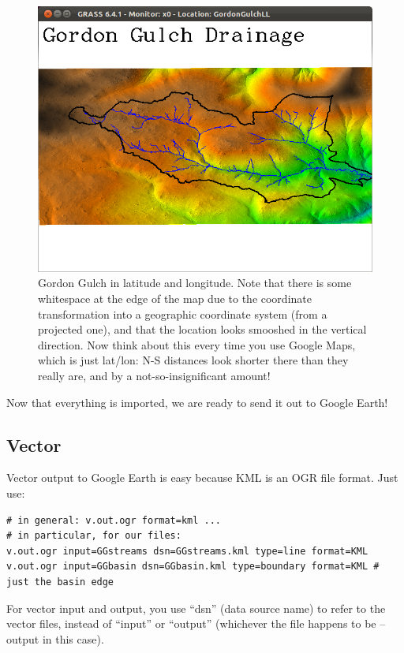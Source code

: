 \documentclass{book}
\begin{document}
\begin{figure}[h]
 \begin{center}
 \includegraphics[width=.9\linewidth]{figures/ubuntu/GGdrain_latlon.png}
 \caption{Gordon Gulch in latitude and longitude. Note that there is some whitespace at the edge of the map due to the coordinate transformation into a geographic coordinate system (from a projected one), and that the location looks smooshed in the vertical direction. Now think about this every time you use Google Maps, which is just lat/lon: N-S distances look shorter there than they really are, and by a not-so-insignificant amount!}
 \label{fig:GGdrain_latlon}
 \end{center}
\end{figure}

Now that everything is imported, we are ready to send it out to Google Earth!

\subsection{Vector}

Vector output to Google Earth is easy because KML is an OGR file format. Just use:
\begin{lstlisting}
# in general: v.out.ogr format=kml ...
# in particular, for our files:
v.out.ogr input=GGstreams dsn=GGstreams.kml type=line format=KML 
v.out.ogr input=GGbasin dsn=GGbasin.kml type=boundary format=KML # just the basin edge
\end{lstlisting}
For vector input and output, you use ``dsn'' (data source name) to refer to the vector files, instead of ``input'' or ``output'' (whichever the file happens to be -- output in this case).
\end{document}
